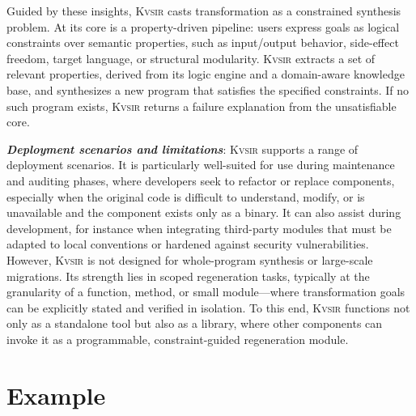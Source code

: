 \documentclass[sigplan,review,anonymous,10pt]{acmart}
\newcommand{\sys}{{\scshape Kv{\textalpha}sir}\xspace}
\newcommand{\heading}[1]{\vspace{2pt}\noindent\textbf{\emph{#1}}:\enspace}
\begin{document}
Guided by these insights, \sys casts transformation as a constrained synthesis problem.
At its core is a property-driven pipeline: users express goals as logical constraints over semantic properties, such as input/output behavior, side-effect freedom, target language, or structural modularity.
\sys extracts a set of relevant properties, derived from its logic engine and a domain-aware knowledge base, and synthesizes a new program that satisfies the specified constraints.
If no such program exists, \sys returns a failure explanation from the unsatisfiable core.

\heading{Deployment scenarios and limitations}
\sys supports a range of deployment scenarios.
It is particularly well-suited for use during maintenance and auditing phases, where developers seek to refactor or replace components, especially when the original code is difficult to understand, modify, or is unavailable and the component exists only as a binary.
It can also assist during development, for instance when integrating third-party modules that must be adapted to local conventions or hardened against security vulnerabilities.
However, \sys is not designed for whole-program synthesis or large-scale migrations.
Its strength lies in scoped regeneration tasks, typically at the granularity of a function, method, or small module---where transformation goals can be explicitly stated and verified in isolation.
To this end, \sys functions not only as a standalone tool but also as a
library, where other components can invoke it as a programmable,
constraint-guided regeneration module.


\section{Example}
\label{sec:example}
\end{document}
